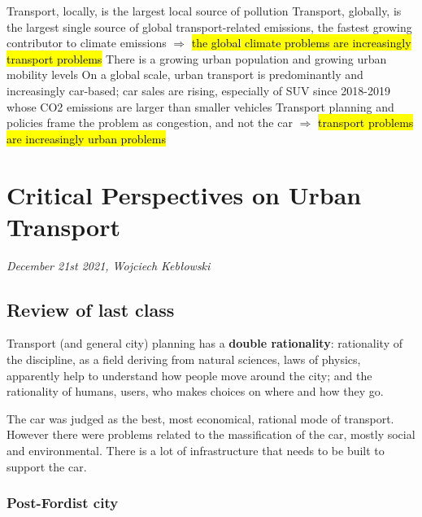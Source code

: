 \documentclass{article}
\begin{document}
\begin{outline}
	\1 Transport, locally, is the largest local source of pollution
	\1 Transport, globally, is the largest single source of global transport-related emissions, the fastest growing contributor to climate emissions
		\2 $\Rightarrow$ \hl{the global climate problems are increasingly transport problems}
	\1 There is a growing urban population and growing urban mobility levels
	\1 On a global scale, urban transport is predominantly and increasingly car-based; car sales are rising, especially of SUV since 2018-2019 whose CO2 emissions are larger than smaller vehicles
	\1 Transport planning and policies frame the problem as congestion, and not the car
		\2 $\Rightarrow$ \hl{transport problems are increasingly urban problems}
\end{outline}
 

\section{Critical Perspectives on Urban Transport}
\textit{December 21st 2021, Wojciech Kebłowski}

\subsection{Review of last class}

Transport (and general city) planning has a \textbf{double rationality}: rationality of the discipline, as a field deriving from natural sciences, laws of physics, apparently help to understand how people move around the city; and the rationality of humans, users, who makes choices on where and how they go.

The car was judged as the best, most economical, rational mode of transport. However there were problems related to the massification of the car, mostly social and environmental. There is a lot of infrastructure that needs to be built to support the car.

\subsubsection{Post-Fordist city}
\end{document}
